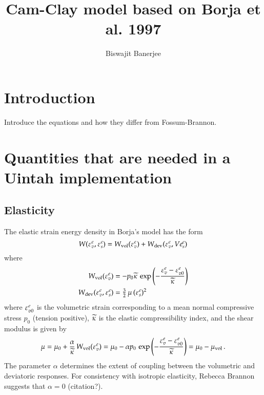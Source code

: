 \documentclass[twoside,10pt,a4paper]{article}
\begin{document}

\title{Cam-Clay model based on Borja et al. 1997}
\author{Biswajit Banerjee}
\maketitle
\tableofcontents
\newpage

\section{Introduction}
Introduce the equations and how they differ from Fossum-Brannon.

\section{Quantities that are needed in a Uintah implementation}
\subsection{Elasticity}
The elastic strain energy density in Borja's model has the form
\[
  W(\Ve^e_v,\Ve^e_s) = W_\Tvol(\Ve^e_v) + W_\Tdev(\Ve^e_v, Ve^e_s)
\]
where
\[
   \Bal
    W_\Tvol(\Ve^e_v) & = -p_0\kappatilde\,\exp\left(-\frac{\Ve^e_v - \Ve^e_{v0}}{\kappatilde}\right) \\
    W_\Tdev(\Ve^e_v,\Ve^e_s) & =  \tfrac{3}{2}\,\mu\,(\Ve^e_s)^2
   \Eal
\]
where $\Ve^e_{v0}$ is the volumetric strain corresponding to a mean normal compressive stress $p_0$ 
(tension positive), $\kappatilde$ is the elastic compressibility index, and the shear modulus is given by
\[
  \mu = \mu_0 + \frac{\alpha}{\kappatilde}\,W_\Tvol(\Ve^e_v) 
      = \mu_0 - \alpha p_0\,\exp\left(-\frac{\Ve^e_v - \Ve^e_{v0}}{\kappatilde}\right) 
      = \mu_0 - \mu_\Tvol\,.
\]
The parameter $\alpha$ determines the extent of coupling between the volumetric and deviatoric 
responses.  For consistency with isotropic elasticity, Rebecca Brannon suggests that $\alpha = 0$ (citation?). 
\end{document}
